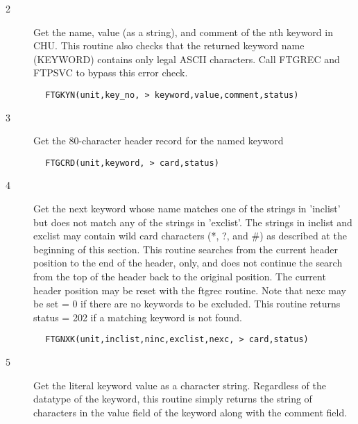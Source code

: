 \documentclass[11pt]{book}
\begin{document}
\begin{description}
\item[2 ] Get the name, value (as a string), and comment of the nth keyword in CHU.
    This routine also checks that the returned keyword name (KEYWORD) contains
    only legal ASCII characters.  Call FTGREC and FTPSVC to bypass this error
   check.
\end{description}

\begin{verbatim}
        FTGKYN(unit,key_no, > keyword,value,comment,status)
\end{verbatim}

\begin{description}
\item[3 ] Get the 80-character header record for the named keyword
\end{description}

\begin{verbatim}
        FTGCRD(unit,keyword, > card,status)
\end{verbatim}

\begin{description}
\item[4 ] Get the next keyword whose name matches one of the strings in
    'inclist' but does not match any of the strings in 'exclist'.
    The strings in inclist and exclist may contain wild card characters
    (*, ?, and \#) as described at the beginning of this section.
    This routine searches from the current header position to the
    end of the header, only, and does not continue the search from
    the top of the header back to the original position.  The current
    header position may be reset with the ftgrec routine.  Note
    that nexc may be set = 0 if there are no keywords to be excluded.
    This routine returns status = 202 if a matching
   keyword is not found.
\end{description}

\begin{verbatim}
        FTGNXK(unit,inclist,ninc,exclist,nexc, > card,status)
\end{verbatim}

\begin{description}
\item[5 ]  Get the literal keyword value as a character string.  Regardless
     of the datatype of the keyword, this routine simply returns the
     string of characters in the value field of the keyword along with
    the comment field.
\end{description}
\end{document}
